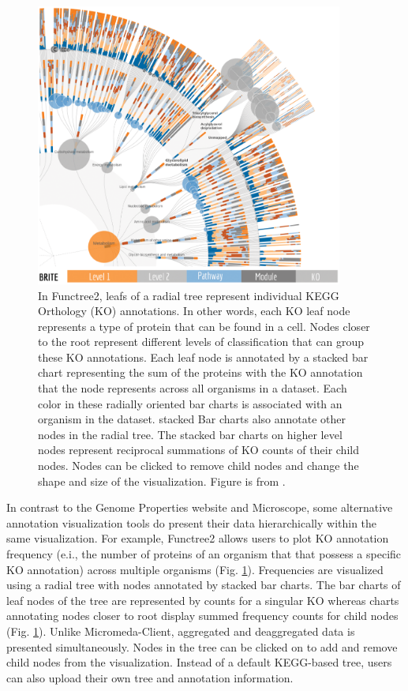 \begin{figure}[!ht]
  \centering
	\includegraphics[width=0.9\textwidth]{media/functree2.png}
	 \caption{In Functree2, leafs of a radial tree represent individual KEGG Orthology (KO) annotations. In other words, each KO leaf node represents a type of protein that can be found in a cell. Nodes closer to the root represent different levels of classification that can group these KO annotations. Each leaf node is annotated by a stacked bar chart representing the sum of the proteins with the KO annotation that the node represents across all organisms in a dataset. Each color in these radially oriented bar charts is associated with an organism in the dataset. stacked Bar charts also annotate other nodes in the radial tree. The stacked bar charts on higher level nodes represent reciprocal summations of KO counts of their child nodes. Nodes can be clicked to remove child nodes and change the shape and size of the visualization. Figure is from \cite{darzi2019functree2}.}
	 \label{fig:functree2}
\end{figure}

In contrast to the Genome Properties website and Microscope, some alternative annotation visualization tools do present their data hierarchically within the same visualization.  For example, Functree2 allows users to plot KO annotation frequency (e.i., the number of proteins of an organism that that possess a specific KO annotation) across multiple organisms (Fig. \ref{fig:functree2}). Frequencies are visualized using a radial tree with nodes annotated by stacked bar charts. The bar charts of leaf nodes of the tree are represented by counts for a singular KO whereas charts annotating nodes closer to root display summed frequency counts for child nodes (Fig. \ref{fig:functree2}). Unlike Micromeda-Client, aggregated and deaggregated data is presented simultaneously. Nodes in the tree can be clicked on to add and remove child nodes from the visualization. Instead of a default KEGG-based tree, users can also upload their own tree and annotation information.

